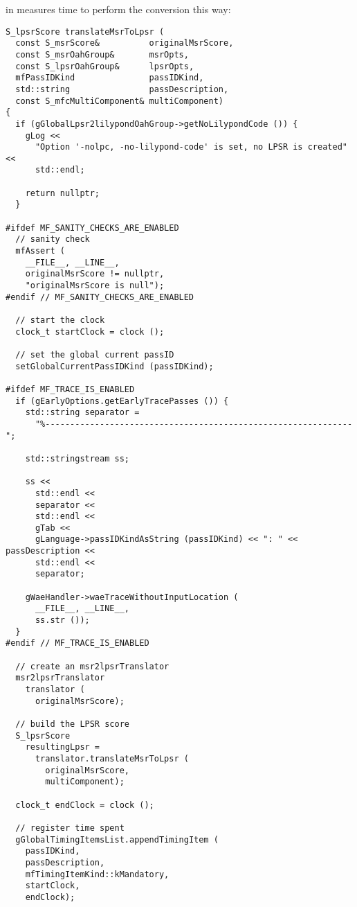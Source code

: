  in  measures time to perform the conversion this way:
\begin{lstlisting}[language=CPlusPlus]
S_lpsrScore translateMsrToLpsr (
  const S_msrScore&          originalMsrScore,
  const S_msrOahGroup&       msrOpts,
  const S_lpsrOahGroup&      lpsrOpts,
  mfPassIDKind               passIDKind,
  std::string                passDescription,
  const S_mfcMultiComponent& multiComponent)
{
  if (gGlobalLpsr2lilypondOahGroup->getNoLilypondCode ()) {
    gLog <<
      "Option '-nolpc, -no-lilypond-code' is set, no LPSR is created" <<
      std::endl;

    return nullptr;
  }

#ifdef MF_SANITY_CHECKS_ARE_ENABLED
  // sanity check
  mfAssert (
    __FILE__, __LINE__,
    originalMsrScore != nullptr,
    "originalMsrScore is null");
#endif // MF_SANITY_CHECKS_ARE_ENABLED

  // start the clock
  clock_t startClock = clock ();

  // set the global current passID
  setGlobalCurrentPassIDKind (passIDKind);

#ifdef MF_TRACE_IS_ENABLED
  if (gEarlyOptions.getEarlyTracePasses ()) {
    std::string separator =
      "%--------------------------------------------------------------";

    std::stringstream ss;

    ss <<
      std::endl <<
      separator <<
      std::endl <<
      gTab <<
      gLanguage->passIDKindAsString (passIDKind) << ": " << passDescription <<
      std::endl <<
      separator;

    gWaeHandler->waeTraceWithoutInputLocation (
      __FILE__, __LINE__,
      ss.str ());
  }
#endif // MF_TRACE_IS_ENABLED

  // create an msr2lpsrTranslator
  msr2lpsrTranslator
    translator (
      originalMsrScore);

  // build the LPSR score
  S_lpsrScore
    resultingLpsr =
      translator.translateMsrToLpsr (
        originalMsrScore,
        multiComponent);

  clock_t endClock = clock ();

  // register time spent
  gGlobalTimingItemsList.appendTimingItem (
    passIDKind,
    passDescription,
    mfTimingItemKind::kMandatory,
    startClock,
    endClock);
\end{lstlisting}
